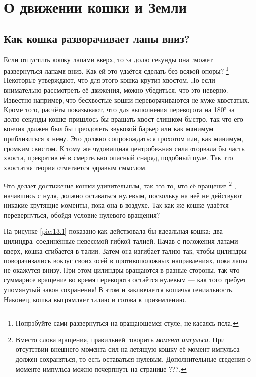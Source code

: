 \chapter{О движении кошки и Земли}

\section{Как кошка разворачивает лапы вниз?}

Если отпустить кошку лапами вверх, то за долю секунды она сможет  развернуться лапами вниз.
Как ей это удаётся сделать без всякой опоры?%
\footnote{Попробуйте сами развернуться на вращающемся стуле, не касаясь пола.}
Некоторые утверждают, что для этого кошка крутит хвостом.
Но если внимательно рассмотреть её движения, можно убедиться, что это неверно.
Известно например, что бесхвостые кошки переворачиваются не хуже хвостатых.
Кроме того, расчёты показывают, что для выполнения переворота на 180° за долю секунды кошке пришлось бы вращать хвост слишком быстро, так что его кончик должен был бы преодолеть звуковой барьер или как минимум приблизиться к нему.
Это должно сопровождаться грохотом или, как минимум, громким свистом.
К тому же чудовищная центробежная сила оторвала бы часть хвоста, превратив её в смертельно опасный снаряд, подобный пуле.
Так что хвостатая теория отметается здравым смыслом.

Что делает достижение кошки удивительным, так это то, что её вращение%
\footnote{Вместо слова вращения, правильней говорить \emph{момент импульса}. При отсутствии внешнего момента сил на летящую кошку её момент импульса должен сохраняться, то есть оставаться нулевым. Дополнительные сведения о моменте импульса можно почерпнуть на странице ???.}%
, начавшись с нуля, должно оставаться нулевым, поскольку на неё не действуют никакие крутящие моменты, пока она в воздухе.
Так как же кошке удаётся перевернуться, обойдя условие нулевого вращения?

На рисунке \ref{pic:13.1} показано как действовала бы идеальная кошка: два цилиндра, соединённые невесомой гибкой талией.
Начав с положения лапами вверх, кошка сгибается в талии.
Затем она изгибает талию так, чтобы цилиндры поворачивались вокруг своих осей в противоположных направлениях, пока лапы не окажутся внизу.
При этом цилиндры вращаются в разные стороны, так что суммарное вращение во время переворота остаётся нулевым — как того требует упомянутый закон сохранения!
В этом и заключается кошачья гениальность.
Наконец, кошка выпрямляет талию и готова к приземлению.

